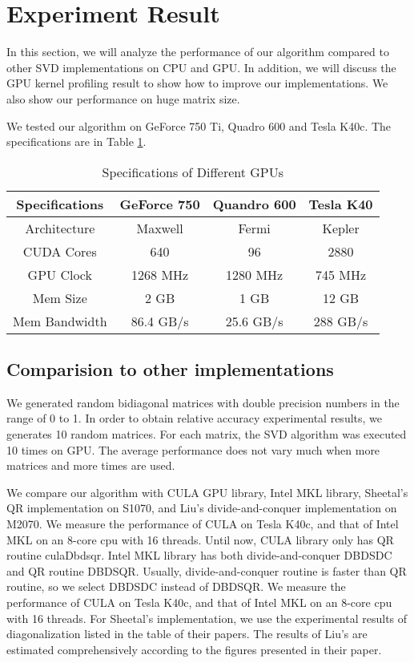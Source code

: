 \section{Experiment Result}
In this section, we will analyze the performance of our algorithm compared to other SVD implementations on CPU and GPU.
In addition, we will discuss the GPU kernel profiling result to show how to improve our implementations.
We also show our performance on huge matrix size.

We tested our algorithm on GeForce 750 Ti, Quadro 600 and Tesla K40c.
The specifications are in Table \ref{tab:spec}.
\begin{table}[h]
\caption{Specifications of Different GPUs}
\centering
\begin{tabular}{|c|c|c|c|}
\hline
Specifications & GeForce 750 & Quandro 600 & Tesla K40 \\ \hline
Architecture   &     Maxwell &       Fermi &    Kepler \\ \hline
CUDA Cores     &         640 &          96 &      2880 \\ \hline
GPU Clock      &    1268 MHz &    1280 MHz &   745 MHz \\ \hline
Mem Size       &        2 GB &        1 GB &     12 GB \\ \hline
Mem Bandwidth  &   86.4 GB/s &   25.6 GB/s &  288 GB/s \\ \hline
\end{tabular}
\label{tab:spec}
\end{table}

\subsection{Comparision to other implementations}
We generated random bidiagonal matrices with double precision numbers in the range of 0 to 1.
In order to obtain relative accuracy experimental results, we generates 10 random matrices.
For each matrix, the SVD algorithm was executed 10 times on GPU.
The average performance does not vary much when more matrices and more times are used.

We compare our algorithm with CULA GPU library, Intel MKL library, Sheetal's QR implementation on S1070, and Liu's divide-and-conquer implementation on M2070.
We measure the performance of CULA on Tesla K40c, and that of Intel MKL on an 8-core cpu with 16 threads.
Until now, CULA library only has QR routine culaDbdsqr.
Intel MKL library has both divide-and-conquer DBDSDC and QR routine DBDSQR.
Usually, divide-and-conquer routine is faster than QR routine, so we select DBDSDC instead of DBDSQR.
We measure the performance of CULA on Tesla K40c, and that of Intel MKL on an 8-core cpu with 16 threads.
For Sheetal's implementation, we use the experimental results of diagonalization listed in the table of their papers.
The results of Liu's are estimated comprehensively according to the figures presented in their paper.


